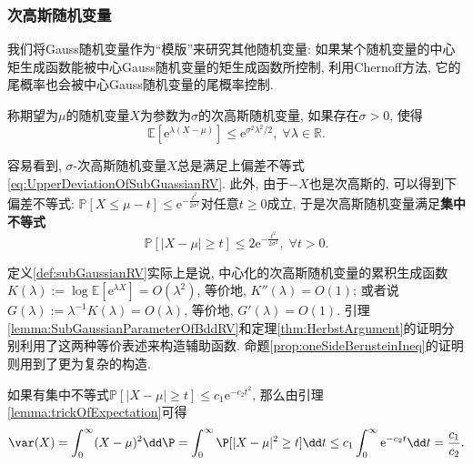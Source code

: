 \subsubsection{次高斯随机变量}

我们将Gauss随机变量作为“模版”来研究其他随机变量: 如果某个随机变量的中心矩生成函数能被中心Gauss随机变量的矩生成函数所控制, 利用Chernoff方法, 它的尾概率也会被中心Gauss随机变量的尾概率控制. 

\begin{definition}[次高斯随机变量]\label{def:subGaussianRV}
	称期望为$\mu$的随机变量$X$为参数为$\sigma$的次高斯随机变量, 如果存在$\sigma > 0$, 使得
	\begin{equation*}
		\mathbb{E}[\mathrm{e}^{\lambda(X - \mu)}] \leq \mathrm{e}^{\sigma^2 \lambda^2 /2},\; \forall \lambda \in \mathbb{R}.   
	\end{equation*}  
\end{definition}
容易看到, $\sigma$-次高斯随机变量$X$总是满足上偏差不等式 \eqref{eq:UpperDeviationOfSubGuassianRV}.  
此外, 由于$-X$也是次高斯的, 可以得到下偏差不等式: $\mathbb{P}[X \leq \mu - t] \leq \mathrm{e}^{- \frac{t^2}{2 \sigma^2}}$对任意$t \geq 0$成立, 于是次高斯随机变量满足\textbf{集中不等式}
\begin{equation}\label{eq:SubGuassianConcentration}
	\mathbb{P}[|X - \mu| \geq t] \leq 2 \mathrm{e}^{- \frac{t^2}{2 \sigma^2}},\; \forall t > 0. 
\end{equation}

\begin{remark}[辅助函数的构造]
	定义\ref{def:subGaussianRV}实际上是说, 中心化的次高斯随机变量的累积生成函数$K(\lambda) := \log \mathbb{E}[\mathrm{e}^{\lambda X}] = O(\lambda^2)$, 等价地, $K''(\lambda) = O(1)$; 
	或者说$G(\lambda) := \lambda^{-1} K(\lambda) = O(\lambda)$, 等价地, $G'(\lambda) = O(1)$. 
	引理\ref{lemma:SubGaussianParameterOfBddRV}和定理\ref{thm:HerbstArgument}的证明分别利用了这两种等价表述来构造辅助函数.
	命题\ref{prop:oneSideBernsteinIneq}的证明则用到了更为复杂的构造.  
\end{remark}

\begin{remark}[方差的界]
	如果有集中不等式$\mathbb{P}[|X - \mu| \geq t] \leq c_1 \mathrm{e}^{- c_2 t^2}$, 那么由引理\ref{lemma:trickOfExpectation}可得
	\begin{equation*}
		\var(X)
		= \int_0^{\infty} (X - \mu)^2 \dd \P 
		= \int_0^{\infty} \P[|X-\mu|^2 \geq t] \dd t 
		\leq c_1 \int_0^{\infty} \mathrm{e}^{- c_2 t} \dd t
		= \frac{c_1}{c_2}.
	\end{equation*}
\end{remark}

